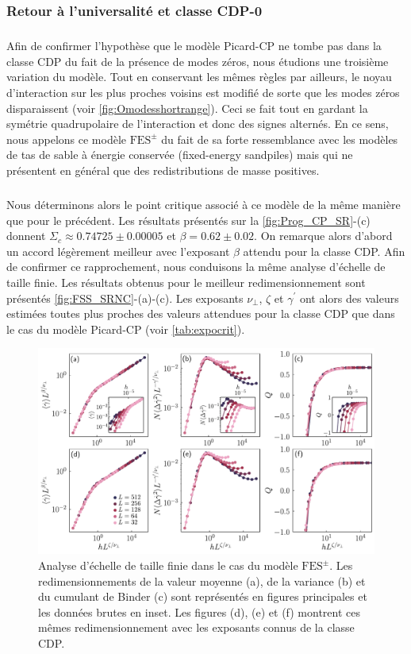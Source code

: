 \subsubsection{Retour à l'universalité et classe CDP-0}

\label{sec:continuCDP0}

\subparagraph{}Afin de confirmer l'hypothèse que le modèle Picard-CP ne tombe pas dans la classe CDP du fait de la présence de modes zéros, nous étudions une troisième variation du modèle. Tout en conservant les mêmes règles par ailleurs, le noyau d'interaction sur les plus proches voisins est modifié de sorte que les modes zéros disparaissent (voir \autoref{fig:Omodesshortrange}). Ceci se fait tout en gardant la symétrie quadrupolaire de l'interaction et donc des signes alternés. En ce sens, nous appelons ce modèle $\text{FES}^\pm$ du fait de sa forte ressemblance avec les modèles de tas de sable à énergie conservée (fixed-energy sandpiles) mais qui ne présentent en général que des redistributions de masse positives.

\subparagraph{}Nous déterminons alors le point critique associé à ce modèle de la même manière que pour le précédent. Les résultats présentés sur la \autoref{fig:Prog_CP_SR}-(c) donnent $\Sigma_c \approx 0.74725 \pm 0.00005$ et $\beta = 0.62 \pm 0.02$. On remarque alors d'abord un accord légèrement meilleur avec l'exposant $\beta$ attendu pour la classe CDP. Afin de confirmer ce rapprochement, nous conduisons la même analyse d'échelle de taille finie. Les résultats obtenus pour le meilleur redimensionnement sont présentés \autoref{fig:FSS_SRNC}-(a)-(c). Les exposants $\nu_\perp$, $\zeta$ et $\gamma^\prime$ ont alors des valeurs estimées toutes plus proches des valeurs attendues pour la classe CDP que dans le cas du modèle Picard-CP (voir \autoref{tab:expocrit}). 

\begin{figure}[h]
	\centering
	\includegraphics[width=\textwidth]{Chapitre4/Figures/CourtePortee/FSS_SRNC_edited.pdf}
	\caption{Analyse d'échelle de taille finie dans le cas du modèle $\text{FES}^\pm$. Les redimensionnements de la valeur moyenne (a), de la variance (b) et du cumulant de Binder (c) sont représentés en figures principales et les données brutes en inset. Les figures (d), (e) et (f) montrent ces mêmes redimensionnement avec les exposants connus de la classe CDP.}
	\label{fig:FSS_SRNC}
\end{figure}

